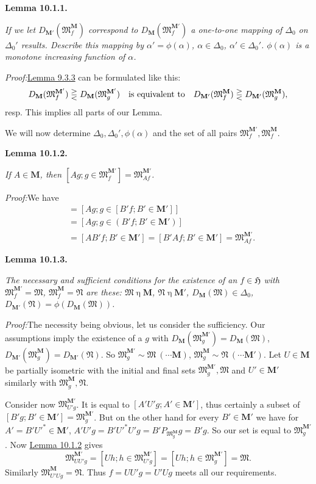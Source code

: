 \documentclass[12pt,b5paper,twoside]{article}
\newcommand{\Hspace}{\mathfrak H}
\newcommand{\M}{\mathbf M}
\newcommand{\Lemma}[1]{%
  \par\smallskip\noindent\phantomsection\label{lem:#1}\textbf{Lemma #1.}\enspace
}
\newcommand{\Proof}{\par\noindent\textit{Proof:}\enspace}
\newcommand{\lemref}[1]{\hyperref[lem:#1]{Lemma #1}}
\begin{document}
\Lemma{10.1.1}
{\itshape
If we let $D_{\M'}(\mathfrak M_f^{\M})$ correspond to
$D_{\M}(\mathfrak M_f^{\M'})$ a one-to-one mapping of $\Delta_0$ on
$\Delta_0'$ results. Describe this mapping by
$\alpha'=\phi(\alpha)$, $\alpha\in\Delta_0$, $\alpha'\in\Delta_0'$.
$\phi(\alpha)$ is a monotone increasing function of $\alpha$.}

\Proof \lemref{9.3.3} can be formulated like this:
\[
 D_{\M}(\mathfrak M_f^{\M'})\gtreqless
 D_{\M}(\mathfrak M_g^{\M'})
\quad\hbox{is equivalent to}\quad
 D_{\M'}(\mathfrak M_f^{\M})\gtreqless
 D_{\M'}(\mathfrak M_g^{\M}),
\]
 resp. This implies all parts of our Lemma.

We will now determine $\Delta_0,\Delta_0',\phi(\alpha)$ and the set of all
pairs $\mathfrak M_f^{\M'},\mathfrak M_f^{\M}$.

\Lemma{10.1.2}
{\itshape
If $A\in\M$, then
$[Ag;g\in\mathfrak M_f^{\M'}]=\mathfrak M_{Af}^{\M'}$.}

\Proof We have
\begin{align*}
 [Ag;g\in\mathfrak M_f^{\M'}]
 &=[Ag;g\in[B'f;B'\in\M']]\\
 &=[Ag;g\in(B'f;B'\in\M')]\\
 &=[AB'f;B'\in\M']=[B'Af;B'\in\M']
 =\mathfrak M_{Af}^{\M'}.
\end{align*}

\Lemma{10.1.3}
{\itshape
The necessary and sufficient conditions for the existence of an
$f\in\Hspace$ with
$\mathfrak M_f^{\M'}=\mathfrak M$, $\mathfrak M_f^{\M}=\mathfrak N$ are
these: $\mathfrak M\mathbin\eta\M$, $\mathfrak N\mathbin\eta\M'$,
$D_{\M}(\mathfrak M)\in\Delta_0$,
$D_{\M'}(\mathfrak N)=\phi(D_{\M}(\mathfrak M))$.}

\Proof The necessity being obvious, let us consider the sufficiency. Our
assumptions imply the existence of a $g$ with
$D_{\M}(\mathfrak M_g^{\M'})=D_{\M}(\mathfrak M)$,
$D_{\M'}(\mathfrak M_g^{\M})=D_{\M'}(\mathfrak N)$. So
$\mathfrak M_g^{\M'}\sim\mathfrak M\ (\cdots\M)$,
$\mathfrak M_g^{\M}\sim\mathfrak N\ (\cdots\M')$. Let $U\in\M$ be
partially isometric with the initial and final sets
$\mathfrak M_g^{\M'},\mathfrak M$ and $U'\in\M'$ similarly with
$\mathfrak M_g^{\M},\mathfrak N$.

Consider now $\mathfrak M_{U'g}^{\M'}$. It is equal to
$[A'U'g;A'\in\M']$, thus certainly a subset of
$[B'g;B'\in\M']=\mathfrak M_g^{\M'}$. But on the other hand for every
$B'\in\M'$ we have for $A'=B'U'^*\in\M'$,
$A'U'g=B'U'^*U'g=B'P_{\mathfrak M_g^{\M}}g=B'g$. So our set is equal to
$\mathfrak M_g^{\M'}$. Now \lemref{10.1.2} gives
\[
 \mathfrak M_{UU'g}^{\M'}=[Uh;h\in\mathfrak M_{U'g}^{\M'}]
 =[Uh;h\in\mathfrak M_g^{\M'}]=\mathfrak M.
\]
Similarly $\mathfrak M_{U'Ug}^{\M}=\mathfrak N$. Thus
$f=UU'g=U'Ug$ meets all our requirements.
\end{document}
